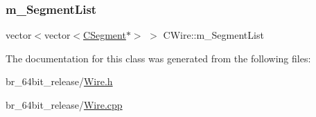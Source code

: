 \mbox{\label{classCWire_ab9e216e49ec590f52cc9a8b45cdf6445}} 
\subsubsection{\texorpdfstring{m\_SegmentList}{m\_SegmentList}}
{\footnotesize\ttfamily vector$<$vector$<$\mbox{\hyperlink{classCSegment}{C\+Segment}}$\ast$$>$ $>$ C\+Wire\+::m\+\_\+\+Segment\+List}



The documentation for this class was generated from the following files\+:\begin{DoxyCompactItemize}
\item 
br\+\_\+64bit\+\_\+release/\mbox{\hyperlink{Wire_8h}{Wire.\+h}}\item 
br\+\_\+64bit\+\_\+release/\mbox{\hyperlink{Wire_8cpp}{Wire.\+cpp}}\end{DoxyCompactItemize}
